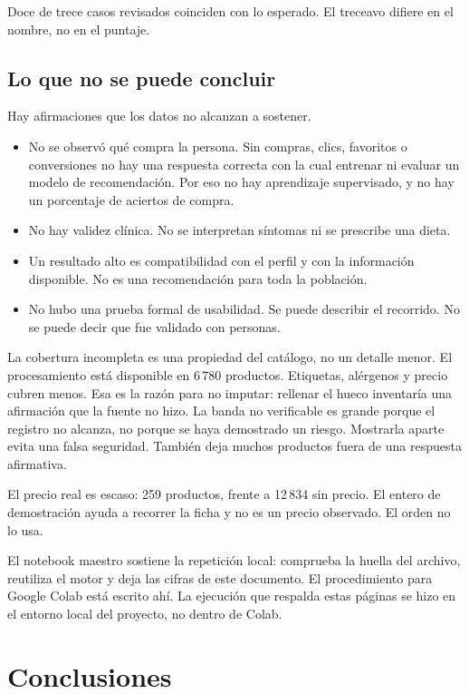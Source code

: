 Doce de trece casos revisados coinciden con lo esperado. El treceavo difiere en el nombre, no en el puntaje.

\subsection{Lo que no se puede concluir}

Hay afirmaciones que los datos no alcanzan a sostener.

\begin{itemize}
  \item No se observó qué compra la persona. Sin compras, clics, favoritos o conversiones no hay una respuesta correcta con la cual entrenar ni evaluar un modelo de recomendación. Por eso no hay aprendizaje supervisado, y no hay un porcentaje de aciertos de compra.
  \item No hay validez clínica. No se interpretan síntomas ni se prescribe una dieta.
  \item Un resultado alto es compatibilidad con el perfil y con la información disponible. No es una recomendación para toda la población.
  \item No hubo una prueba formal de usabilidad. Se puede describir el recorrido. No se puede decir que fue validado con personas.
\end{itemize}

La cobertura incompleta es una propiedad del catálogo, no un detalle menor. El procesamiento está disponible en 6\,780 productos. Etiquetas, alérgenos y precio cubren menos. Esa es la razón para no imputar: rellenar el hueco inventaría una afirmación que la fuente no hizo. La banda no verificable es grande porque el registro no alcanza, no porque se haya demostrado un riesgo. Mostrarla aparte evita una falsa seguridad. También deja muchos productos fuera de una respuesta afirmativa.

El precio real es escaso: 259 productos, frente a 12\,834 sin precio. El entero de demostración ayuda a recorrer la ficha y no es un precio observado. El orden no lo usa.

El notebook maestro sostiene la repetición local: comprueba la huella del archivo, reutiliza el motor y deja las cifras de este documento. El procedimiento para Google Colab está escrito ahí. La ejecución que respalda estas páginas se hizo en el entorno local del proyecto, no dentro de Colab.

\section{Conclusiones}

